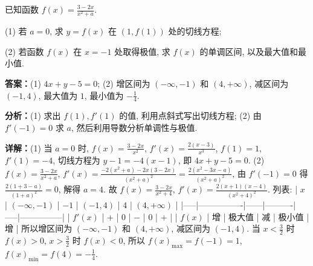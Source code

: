 \begin{question}[points=15]
已知函数 $f(x)=\frac{3-2x}{x^2+a}$.

(1) 若 $a=0$, 求 $y=f(x)$ 在 $(1,f(1))$ 处的切线方程;

(2) 若函数 $f(x)$ 在 $x=-1$ 处取得极值, 求 $f(x)$ 的单调区间, 以及最大值和最小值.
\begin{solution}
\textbf{答案：}(1) $4x+y-5=0$; (2) 增区间为 $(-\infty,-1)$ 和 $(4,+\infty)$, 减区间为 $(-1,4)$, 最大值为 $1$, 最小值为 $-\frac{1}{4}$.

\textbf{分析：}(1) 求出 $f(1),f'(1)$ 的值, 利用点斜式写出切线方程; (2) 由 $f'(-1)=0$ 求 $a$, 然后利用导数分析单调性与极值.

\textbf{详解：}(1) 当 $a=0$ 时, $f(x)=\frac{3-2x}{x^2}$, $f'(x)=\frac{2(x-3)}{x^3}$, $f(1)=1$, $f'(1)=-4$, 切线方程为 $y-1=-4(x-1)$, 即 $4x+y-5=0$.
(2) $f(x)=\frac{3-2x}{x^2+a}$, $f'(x)=\frac{-2(x^2+a)-2x(3-2x)}{(x^2+a)^2}=\frac{2(x^2-3x-a)}{(x^2+a)^2}$, 由 $f'(-1)=0$ 得 $\frac{2(1+3-a)}{(1+a)^2}=0$, 解得 $a=4$. 故 $f(x)=\frac{3-2x}{x^2+4}$, $f'(x)=\frac{2(x+1)(x-4)}{(x^2+4)^2}$. 列表:
| $x$ | $(-\infty,-1)$ | $-1$ | $(-1,4)$ | $4$ | $(4,+\infty)$ |
|-----|----------------|------|----------|-----|---------------|
| $f'(x)$ | $+$ | $0$ | $-$ | $0$ | $+$ |
| $f(x)$ | 增 | 极大值 | 减 | 极小值 | 增 |
所以增区间为 $(-\infty,-1)$ 和 $(4,+\infty)$, 减区间为 $(-1,4)$. 当 $x<\frac{3}{2}$ 时 $f(x)>0$, $x>\frac{3}{2}$ 时 $f(x)<0$, 所以 $f(x)_{\max}=f(-1)=1$, $f(x)_{\min}=f(4)=-\frac{1}{4}$.
\end{solution}
\end{question}

